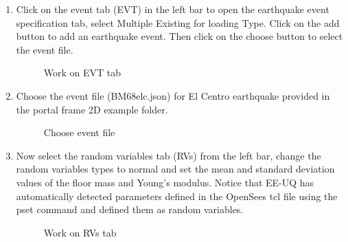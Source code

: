 \begin{enumerate}
\item Click on the event tab (EVT) in the left bar to open the earthquake event specification tab, select Multiple Existing for loading Type. Click on the add button to add an earthquake event. 
Then click on the choose button to select the event file.
\begin{figure}[!htbp]
  \caption{Work on EVT tab}
  \label{fig:figure24}
\end{figure}

\item Choose the event file (BM68elc.json) for El Centro earthquake provided in the portal frame 2D example folder.
\begin{figure}[!htbp]
  \caption{Choose event file}
  \label{fig:figure25}
\end{figure}

\item Now select the random variables tab (RVs) from the left bar, change the random variables types to normal 
and set the mean and standard deviation values of the floor mass and Young’s modulus. 
Notice that EE-UQ has automatically detected parameters defined in the OpenSees tcl file using the pset command and defined them as random variables.
\begin{figure}[!htbp]
  \caption{Work on RVs tab}
  \label{fig:figure26}
\end{figure}


\end{enumerate}
